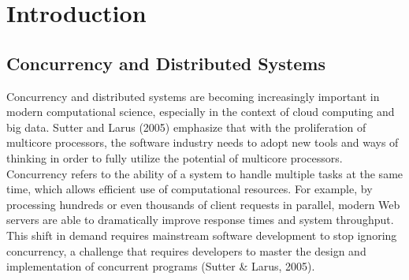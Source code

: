 \documentclass{l4proj}
\begin{document}
%
%
%
%
%
%
%
%
\chapter{Introduction}



\section{Concurrency and Distributed Systems}

Concurrency and distributed systems are becoming increasingly important in modern computational science, especially in the context of cloud computing and big data. Sutter and Larus (2005) emphasize that with the proliferation of multicore processors, the software industry needs to adopt new tools and ways of thinking in order to fully utilize the potential of multicore processors. Concurrency refers to the ability of a system to handle multiple tasks at the same time, which allows efficient use of computational resources. For example, by processing hundreds or even thousands of client requests in parallel, modern Web servers are able to dramatically improve response times and system throughput. This shift in demand requires mainstream software development to stop ignoring concurrency, a challenge that requires developers to master the design and implementation of concurrent programs (Sutter & Larus, 2005).
    
\end{document}
